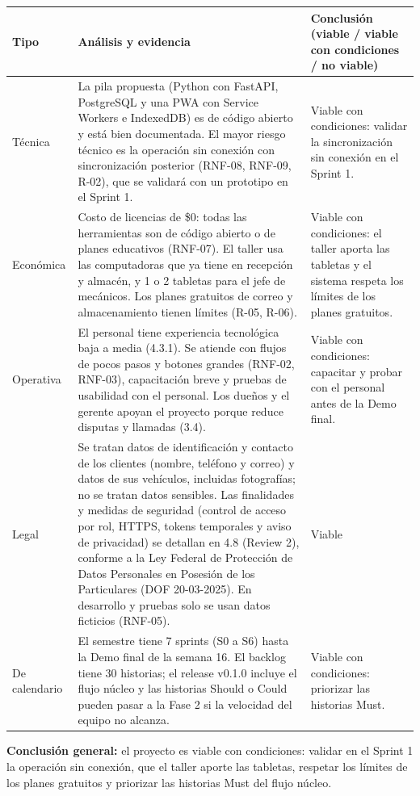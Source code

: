 {\def\LTcaptype{none} %
\begin{longtable}[]{@{}
  >{\raggedright\arraybackslash}p{}
  >{\raggedright\arraybackslash}p{}
  >{\raggedright\arraybackslash}p{}@{}}
\toprule\noalign{}
\begin{minipage}[b]{\linewidth}\raggedright
\textbf{Tipo}
\end{minipage} & \begin{minipage}[b]{\linewidth}\raggedright
\textbf{Análisis y evidencia}
\end{minipage} & \begin{minipage}[b]{\linewidth}\raggedright
\textbf{Conclusión (viable / viable con condiciones / no viable)}
\end{minipage} \\
\midrule\noalign{}
\endhead
\bottomrule\noalign{}
\endlastfoot
Técnica & La pila propuesta (Python con FastAPI, PostgreSQL y una PWA
con Service Workers e IndexedDB) es de código abierto y está bien
documentada. El mayor riesgo técnico es la operación sin conexión con
sincronización posterior (RNF-08, RNF-09, R-02), que se validará con un
prototipo en el Sprint 1. & Viable con condiciones: validar la
sincronización sin conexión en el Sprint 1. \\
Económica & Costo de licencias de \$0: todas las herramientas son de
código abierto o de planes educativos (RNF-07). El taller usa las
computadoras que ya tiene en recepción y almacén, y 1 o 2 tabletas para
el jefe de mecánicos. Los planes gratuitos de correo y almacenamiento
tienen límites (R-05, R-06). & Viable con condiciones: el taller aporta
las tabletas y el sistema respeta los límites de los planes
gratuitos. \\
Operativa & El personal tiene experiencia tecnológica baja a media
(4.3.1). Se atiende con flujos de pocos pasos y botones grandes (RNF-02,
RNF-03), capacitación breve y pruebas de usabilidad con el personal. Los
dueños y el gerente apoyan el proyecto porque reduce disputas y llamadas
(3.4). & Viable con condiciones: capacitar y probar con el personal
antes de la Demo final. \\
Legal & Se tratan datos de identificación y contacto de los clientes
(nombre, teléfono y correo) y datos de sus vehículos, incluidas
fotografías; no se tratan datos sensibles. Las finalidades y medidas de
seguridad (control de acceso por rol, HTTPS, tokens temporales y aviso
de privacidad) se detallan en 4.8 (Review 2), conforme a la Ley Federal de Protección de
Datos Personales en Posesión de los Particulares (DOF 20-03-2025). En
desarrollo y pruebas solo se usan datos ficticios (RNF-05). & Viable \\
De calendario & El semestre tiene 7 sprints (S0 a S6) hasta la Demo
final de la semana 16. El backlog tiene 30 historias; el release v0.1.0
incluye el flujo núcleo y las historias Should o Could pueden pasar a la
Fase 2 si la velocidad del equipo no alcanza. & Viable con condiciones:
priorizar las historias Must. \\
\end{longtable}
}

\textbf{Conclusión general:} el proyecto es viable con condiciones:
validar en el Sprint 1 la operación sin conexión, que el taller aporte
las tabletas, respetar los límites de los planes gratuitos y priorizar
las historias Must del flujo núcleo.
